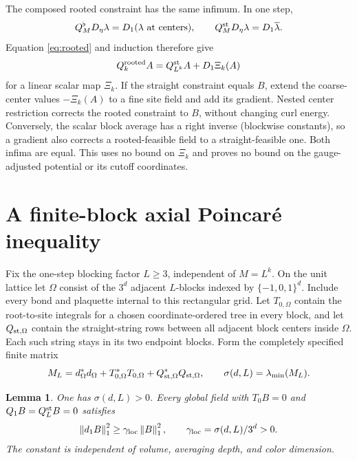 \documentclass[11pt]{article}
\newtheorem{lemma}[theorem]{Lemma}
\theoremstyle{remark}
\newcommand{\norm}[1]{\left\|#1\right\|}
\begin{document}
The composed rooted constraint has the same infimum. In one step,
\[
 Q_M^\flat D_\eta\lambda=D_1(\lambda\hbox{ at centers}),
 \qquad
 Q_M^{\rm st}D_\eta\lambda=D_1\overline\lambda.
\]
Equation \eqref{eq:rooted} and induction therefore give
\[
 Q_k^{\rm rooted}A=Q_{L^k}^{\rm st}A+D_1\Xi_k(A)
\]
for a linear scalar map $\Xi_k$. If the straight constraint equals
$B$, extend the coarse-center values $-\Xi_k(A)$ to a fine site
field and add its gradient. Nested center restriction corrects the
rooted constraint to $B$, without changing curl energy. Conversely,
the scalar block average has a right inverse (blockwise constants),
so a gradient also corrects a rooted-feasible field to a
straight-feasible one. Both infima are equal. This uses no bound
on $\Xi_k$ and proves no bound on the gauge-adjusted potential or
its cutoff coordinates.

\section{A finite-block axial Poincar\'e inequality}

Fix the one-step blocking factor $L\ge3$, independent of $M=L^k$.
On the unit lattice let $\Omega$ consist of the $3^d$ adjacent
$L$-blocks indexed by $\{-1,0,1\}^d$. Include every bond and
plaquette internal to this rectangular grid. Let $T_{0,\Omega}$
contain the root-to-site integrals for a chosen coordinate-ordered
tree in every block, and let $Q_{{\rm st},\Omega}$ contain the
straight-string rows between all adjacent block centers inside
$\Omega$. Each such string stays in its two endpoint blocks.
Form the completely specified finite matrix
\[
 M_L=d_\Omega^*d_\Omega
       +T_{0,\Omega}^*T_{0,\Omega}
       +Q_{{\rm st},\Omega}^*Q_{{\rm st},\Omega},
 \qquad \sigma(d,L)=\lambda_{\min}(M_L).
\]

\begin{lemma}\label{lem:poincare}
One has $\sigma(d,L)>0$. Every global field with
$T_0B=0$ and $Q_1B=Q_L^{\rm st}B=0$ satisfies
\begin{equation}\label{eq:axial-gap}
 \norm{d_1B}_1^2\ge\gamma_{\rm loc}\norm B_1^2,
 \qquad \gamma_{\rm loc}=\sigma(d,L)/3^d>0.
\end{equation}
The constant is independent of volume, averaging depth, and color
dimension.
\end{lemma}
\end{document}
